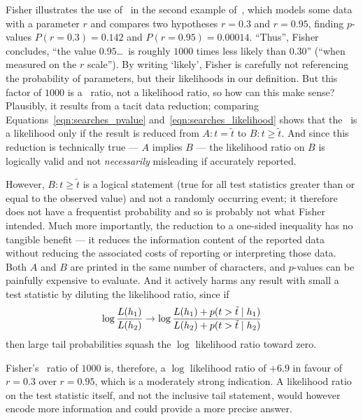 Fisher illustrates the use of \pvalues\ in the second example
of~\cite{fisher1921probable}, which models some data with a parameter $r$ and
compares two hypotheses
$r=0.3$ and
$r=0.95$, finding $p$-values
$P(r=0.3)=0.142$ and
$P(r=0.95)=0.00014$.
``Thus'', Fisher concludes, ``the value $0.95$\ldots\ is roughly $1000$ times
less likely than $0.30$''
(``when measured on the $r$ scale'').
By writing `likely', Fisher is carefully not referencing the probability
of parameters, but their likelihoods in our definition.
But this factor of $1000$ is a \pvalue\ ratio, not a likelihood ratio,
so how can this make sense?
Plausibly, it results from a tacit data reduction; comparing
Equations~\ref{eqn:searches_pvalue} and~\ref{eqn:searches_likelihood}
shows that the \pvalue\ is a likelihood only if the result is reduced from
$A: t =    \tilde{t}$ to
$B: t \geq \tilde{t}$.
And since this reduction is technically true --- $A$ implies $B$ --- the
likelihood ratio on $B$ is logically valid and not \emph{necessarily}
misleading if accurately reported.

However, $B: t \geq \tilde{t}$ is a logical statement (true for all test
statistics greater than or equal to the observed value) and not a randomly
occurring event; it therefore does not have a frequentist probability and so
is probably not what Fisher intended.
Much more importantly, the reduction to a one-sided inequality has no tangible
benefit --- it reduces the information content of the reported data without
reducing the associated costs of reporting or interpreting those data.
Both $A$ and $B$ are printed in the same number of characters, and $p$-values
can be painfully expensive to evaluate.
And it actively harms any result with small a test statistic by
diluting the likelihood ratio, since if
\begin{equation}
\log \frac{L(h_1)}{L(h_2)}
\to
\log \frac{
L(h_1) + p(t > \tilde{t} \mid h_1)
}
{
L(h_2) + p(t > \tilde{t} \mid h_2)
}
\end{equation}
then large tail probabilities squash the $\log$ likelihood ratio toward zero.

Fisher's \pvalue\ ratio of $1000$ is, therefore, a $\log$ likelihood
ratio of $+6.9$ in favour of $r=0.3$ over $r=0.95$, which is a moderately
strong indication.
A likelihood ratio on the test statistic itself, and not the inclusive
tail statement, would however encode more information and could provide a
more precise answer.

